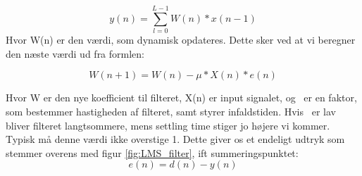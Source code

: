 \begin{equation}
  y(n) = \displaystyle\sum_{l=0}^{L-1} W(n)*x(n-1)
\end{equation}
Hvor W(n) er den værdi, som dynamisk opdateres. Dette sker ved at vi beregner den næste værdi ud fra formlen: 

\begin{equation}
  W(n+1) = W(n)-\mu *X(n)*e(n)
\end{equation}

Hvor W er den nye koefficient til filteret, X(n) er input signalet, og \textmu\ er en faktor, som bestemmer hastigheden af filteret, samt styrer infaldstiden. Hvis \textmu\ er lav bliver filteret langtsommere, mens settling time stiger jo højere vi kommer. Typisk må denne værdi ikke overstige 1. 
\newline
Dette giver os et endeligt udtryk som stemmer overens med figur \ref{fig:LMS_filter}, ift summeringspunktet: 
\begin{equation}
  e(n) = d(n)-y(n)
\end{equation} 
